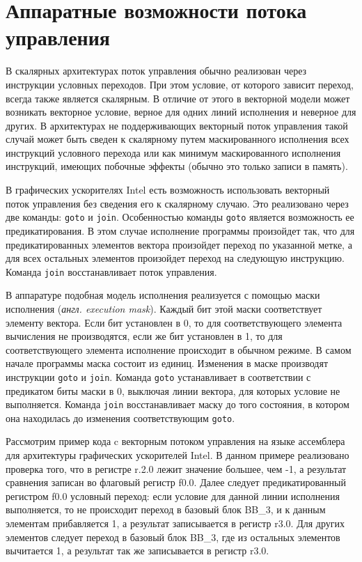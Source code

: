 \section{Аппаратные возможности потока управления}
\label{sec:Goto}

В скалярных архитектурах поток управления обычно реализован через инструкции
условных переходов. При этом условие, от которого зависит переход, всегда также
является скалярным. В отличие от этого в векторной модели может возникать
векторное условие, верное для одних линий исполнения и неверное для других.
В архитектурах не поддерживающих векторный поток управления такой случай может
быть сведен к скалярному путем маскированного исполнения всех инструкций
условного перехода или как минимум маскированного исполнения инструкций,
имеющих побочные эффекты (обычно это только записи в память).

В графических ускорителях Intel есть возможность использовать векторный поток
управления без сведения его к скалярному случаю. Это реализовано через две
команды: \texttt{goto} и \texttt{join}. Особенностью команды \texttt{goto}
является возможность ее предикатирования. В этом случае исполнение программы
произойдет так, что для предикатированных элементов вектора произойдет переход
по указанной метке, а для всех остальных элементов произойдет переход на
следующую инструкцию. Команда \texttt{join} восстанавливает поток управления.

В аппаратуре подобная модель исполнения реализуется с помощью маски исполнения
(\textit{англ. execution mask}). Каждый бит этой маски соответствует элементу
вектора. Если бит установлен в 0, то для соответствующего элемента вычисления не
производятся, если же бит установлен в 1, то для соответствующего элемента
исполнение происходит в обычном режиме. В самом начале программы маска состоит
из единиц. Изменения в маске производят инструкции \texttt{goto} и \texttt{join}.
Команда \texttt{goto} устанавливает в соответствии с предикатом биты маски в 0,
выключая линии вектора, для которых условие не выполняется. Команда \texttt{join}
восстанавливает маску до того состояния, в котором она находилась до изменения
соответствующим \texttt{goto}.

Рассмотрим пример кода c векторным потоком управления на языке ассемблера для
архитектуры графических ускорителей Intel. В данном примере реализовано проверка
того, что в регистре r.2.0 лежит значение большее, чем -1, а результат сравнения
записан во флаговый регистр f0.0. Далее следует предикатированный регистром f0.0
условный переход: если условие для данной линии исполнения выполняется, то не
происходит переход в базовый блок BB\_3, и к данным элементам прибавляется 1, а
результат записывается в регистр r3.0. Для других элементов следует переход в
базовый блок BB\_3, где из остальных элементов вычитается 1, а результат так же
записывается в регистр r3.0.

